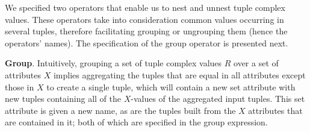 We specified two operators that enable us to nest and unnest tuple complex values. These operators take into consideration common values occurring in several tuples, therefore facilitating grouping or ungrouping them (hence the operators' names). The specification of the group operator is presented next.

\vspace*{0.25cm}
\noindent \textbf{Group}. Intuitively, grouping a set of tuple complex values $R$ over a set of attributes $X$ implies aggregating the tuples that are equal in all attributes except those in $X$ to create a single tuple, which will contain a new set attribute with new tuples containing all of the $X$-values of the aggregated input tuples. This set attribute is given a new name, as are the tuples built from the $X$ attributes that are contained in it; both of which are specified in the group expression.


